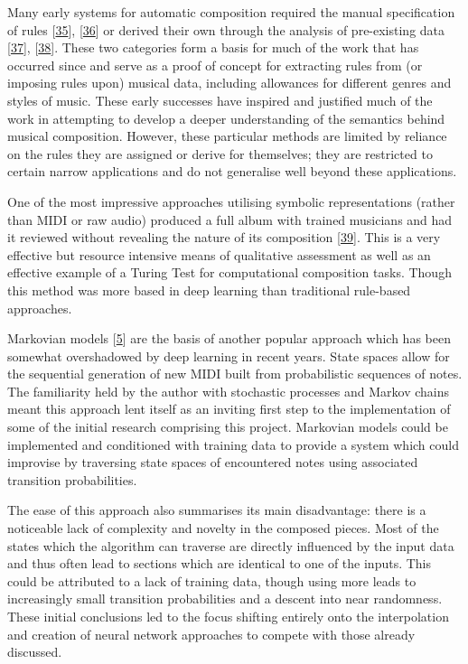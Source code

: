 \documentclass[12pt,]{article}
\begin{document}
Many early systems for automatic composition required the manual
specification of rules
{[}\protect\hyperlink{ref-ebciouglu1988expert}{35}{]},
{[}\protect\hyperlink{ref-cruz1998learning}{36}{]} or derived their own
through the analysis of pre-existing data
{[}\protect\hyperlink{ref-cope1996experiments}{37}{]},
{[}\protect\hyperlink{ref-spangler1998bach}{38}{]}. These two categories
form a basis for much of the work that has occurred since and serve as a
proof of concept for extracting rules from (or imposing rules upon)
musical data, including allowances for different genres and styles of
music. These early successes have inspired and justified much of the
work in attempting to develop a deeper understanding of the semantics
behind musical composition. However, these particular methods are
limited by reliance on the rules they are assigned or derive for
themselves; they are restricted to certain narrow applications and do
not generalise well beyond these applications.

One of the most impressive approaches utilising symbolic representations
(rather than MIDI or raw audio) produced a full album with trained
musicians and had it reviewed without revealing the nature of its
composition {[}\protect\hyperlink{ref-sturm2018let}{39}{]}. This is a
very effective but resource intensive means of qualitative assessment as
well as an effective example of a Turing Test for computational
composition tasks. Though this method was more based in deep learning
than traditional rule-based approaches.

Markovian models {[}\protect\hyperlink{ref-luque2009stochastic}{5}{]}
are the basis of another popular approach which has been somewhat
overshadowed by deep learning in recent years. State spaces allow for
the sequential generation of new MIDI built from probabilistic sequences
of notes. The familiarity held by the author with stochastic processes
and Markov chains meant this approach lent itself as an inviting first
step to the implementation of some of the initial research comprising
this project. Markovian models could be implemented and conditioned with
training data to provide a system which could improvise by traversing
state spaces of encountered notes using associated transition
probabilities.

The ease of this approach also summarises its main disadvantage: there
is a noticeable lack of complexity and novelty in the composed pieces.
Most of the states which the algorithm can traverse are directly
influenced by the input data and thus often lead to sections which are
identical to one of the inputs. This could be attributed to a lack of
training data, though using more leads to increasingly small transition
probabilities and a descent into near randomness. These initial
conclusions led to the focus shifting entirely onto the interpolation
and creation of neural network approaches to compete with those already
discussed.
\end{document}
